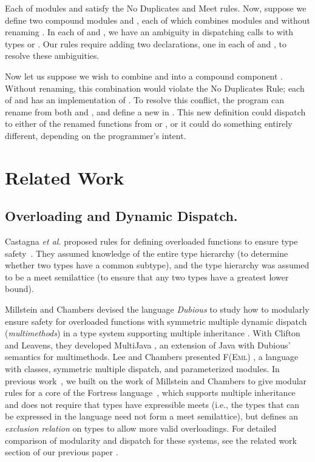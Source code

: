 \documentclass[10pt]{sigplanconf}
\begin{document}
Each of modules  and  satisfy the No Duplicates and Meet rules.
Now, suppose we define two compound modules  and , 
each of which combines modules  and  without renaming .
In each of  and , 
we have an ambiguity 
in dispatching calls to  with types  or .
Our rules require adding two declarations, one in each of  and ,
to resolve these ambiguities.

Now let us suppose we wish to combine  and  into a compound component .
Without renaming, this combination would violate the No Duplicates Rule;
each of  and  has an implementation of . 
To resolve this conflict, 
the program can rename  from both  and , 
and define a new  in . 
This new definition could dispatch to either of the renamed functions from  or , 
or it could do something entirely different, 
depending on the programmer's intent.


\section{Related Work}\label{sec:related}
\subsection{Overloading and Dynamic Dispatch.} 

Castagna \emph{et al.} proposed rules for defining overloaded functions
to ensure type safety~\cite{castagna95}.
They assumed knowledge of the entire type hierarchy 
(to determine whether two types have a common subtype), 
and the type hierarchy was assumed to be a meet semilattice 
(to ensure that any two types have a greatest lower bound).

Millstein and Chambers devised the language \emph{Dubious} to study 
how to modularly ensure safety for 
overloaded functions with symmetric multiple dynamic dispatch (\emph{multimethods})
in a type system supporting multiple inheritance \cite{millstein02,millstein03}.
With Clifton and Leavens, 
they developed MultiJava \cite{multijava}, 
an extension of Java with Dubious' semantics for multimethods.
Lee and Chambers presented F(E\textsc{ml}) \cite{feml}, 
a language with classes, symmetric multiple dispatch, and parameterized modules.
In previous work~\cite{allen07},
we built on the work of Millstein and Chambers 
to give modular rules for a core of the Fortress language~\cite{Fortress}, 
which supports multiple inheritance 
and does not require that types have expressible meets 
(i.e., the types that can be expressed in the language 
need not form a meet semilattice), 
but defines an \emph{exclusion relation} on types 
to allow more valid overloadings.
For detailed comparison of modularity and dispatch 
for these systems, 
see the related work section of our previous paper \cite{allen07}.
\end{document}

